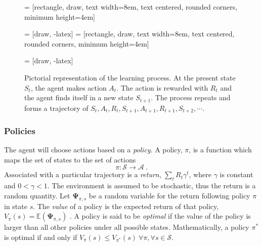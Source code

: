 \begin{figure}[h!]
\centering
	
 = [rectangle, draw, 
text width=8em, text centered, rounded corners, minimum height=4em]

 = [draw, -latex]
 = [rectangle, draw, 
text width=8em, text centered, rounded corners, minimum height=4em]

 = [draw, -latex]


\caption[Reinforcement learning process]{Pictorial representation of the learning process.  At the present state $ S_t $, the agent makes action $ A_t $.  The action is rewarded with $ R_t $ and the agent finds itself in a new state $ S_{t+1} $.  The process repeats and forms a trajectory of $ {S_t,A_t,R_t,S_{t+1}, A_{t+1}, R_{t+1}, S_{t+2}, \cdots} $.  }
\label{RL_diagram}
\end{figure}


\subsubsection{Policies}

The agent will choose actions based on a \textit{policy}.  A policy, $ \pi $, is a function which maps the set of states to the set of actions  
%
\begin{equation}\label{key}
\pi : \mathcal{S} \rightarrow \mathcal{A}\>.
\end{equation}
%
Associated with a particular trajectory is a \textit{return}, $ \sum_t R_t \gamma^t $, where $ \gamma $ is constant and $ 0 < \gamma < 1 $.  The environment is assumed to be stochastic, thus the return is a  random quantity. Let $ \mathbf{\Psi}_{\pi,s} $ be a random variable for the return following policy $ \pi $ in state $ s $.  The \textit{value} of a policy is the expected return of that policy, $V_{\pi}(s) =  \mathbb{E}(\mathbf{\Psi}_{\pi,s}) $ \cite{lizotte2017reinforcement}.  A policy is said to be \textit{optimal} if the value of the policy is larger than all other policies under all possible states.  Mathematically, a policy $ \pi^* $ is optimal if and only if $ V_{\pi}(s)  \leq V_{\pi^*}(s) \> \forall \pi, \forall s\in \mathcal{S}  $.


